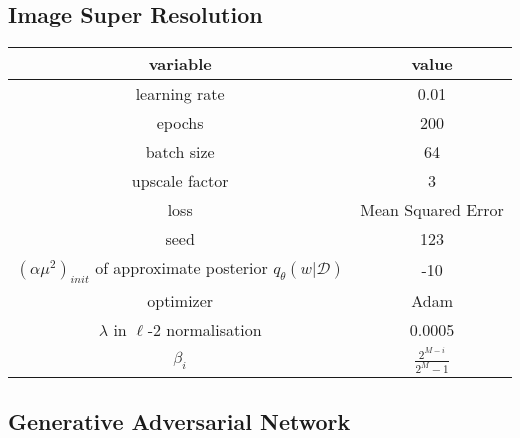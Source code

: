 \subsection{Image Super Resolution}

\begin{table}[H]
    \centering
    \renewcommand{\arraystretch}{2}
    \begin{tabular}[c]{c | c} 
     \hline
     variable & value \\ [0.5ex] 
     \hline
     learning rate &  0.01\\ 
     
     epochs & 200 \\
     
     batch size & 64 \\
     
     upscale factor & 3 \\
     
     loss & Mean Squared Error \\
     
     seed & 123 \\
     
     $(\alpha \mu^2)_{init}$ of approximate posterior $q_{\theta}(w|\mathcal{D})$ & -10 \\
     
     optimizer & Adam \cite{kingma2014adam} \\
     
     $\lambda$ in $\ell$-2 normalisation & 0.0005 \\
    
     $\beta_i$ & $\frac{2^{M-i}}{2^M-1}$ \cite{blundell2015weight} \\ [1ex] 
     \hline
    \end{tabular} 
    \renewcommand{\arraystretch}{2}
\end{table}


\subsection{Generative Adversarial Network}


